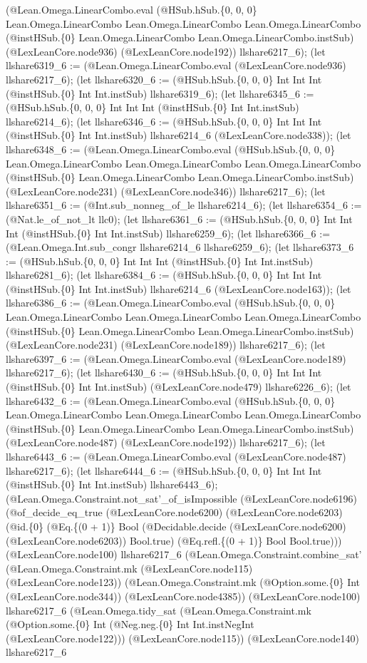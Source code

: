 \documentclass[11pt]{article}
\begin{document}
(@Lean.Omega.LinearCombo.eval (@HSub.hSub.\{0, 0, 0\} Lean.Omega.LinearCombo Lean.Omega.LinearCombo Lean.Omega.LinearCombo (@instHSub.\{0\} Lean.Omega.LinearCombo Lean.Omega.LinearCombo.instSub) (@LexLeanCore.node936) (@LexLeanCore.node192)) llshare6217\_6); (let llshare6319\_6 := (@Lean.Omega.LinearCombo.eval (@LexLeanCore.node936) llshare6217\_6); (let llshare6320\_6 := (@HSub.hSub.\{0, 0, 0\} Int Int Int (@instHSub.\{0\} Int Int.instSub) llshare6319\_6); (let llshare6345\_6 := (@HSub.hSub.\{0, 0, 0\} Int Int Int (@instHSub.\{0\} Int Int.instSub) llshare6214\_6); (let llshare6346\_6 := (@HSub.hSub.\{0, 0, 0\} Int Int Int (@instHSub.\{0\} Int Int.instSub) llshare6214\_6 (@LexLeanCore.node338)); (let llshare6348\_6 := (@Lean.Omega.LinearCombo.eval (@HSub.hSub.\{0, 0, 0\} Lean.Omega.LinearCombo Lean.Omega.LinearCombo Lean.Omega.LinearCombo (@instHSub.\{0\} Lean.Omega.LinearCombo Lean.Omega.LinearCombo.instSub) (@LexLeanCore.node231) (@LexLeanCore.node346)) llshare6217\_6); (let llshare6351\_6 := (@Int.sub\_nonneg\_of\_le llshare6214\_6); (let llshare6354\_6 := (@Nat.le\_of\_not\_lt llc0); (let llshare6361\_6 := (@HSub.hSub.\{0, 0, 0\} Int Int Int (@instHSub.\{0\} Int Int.instSub) llshare6259\_6); (let llshare6366\_6 := (@Lean.Omega.Int.sub\_congr llshare6214\_6 llshare6259\_6); (let llshare6373\_6 := (@HSub.hSub.\{0, 0, 0\} Int Int Int (@instHSub.\{0\} Int Int.instSub) llshare6281\_6); (let llshare6384\_6 := (@HSub.hSub.\{0, 0, 0\} Int Int Int (@instHSub.\{0\} Int Int.instSub) llshare6214\_6 (@LexLeanCore.node163)); (let llshare6386\_6 := (@Lean.Omega.LinearCombo.eval (@HSub.hSub.\{0, 0, 0\} Lean.Omega.LinearCombo Lean.Omega.LinearCombo Lean.Omega.LinearCombo (@instHSub.\{0\} Lean.Omega.LinearCombo Lean.Omega.LinearCombo.instSub) (@LexLeanCore.node231) (@LexLeanCore.node189)) llshare6217\_6); (let llshare6397\_6 := (@Lean.Omega.LinearCombo.eval (@LexLeanCore.node189) llshare6217\_6); (let llshare6430\_6 := (@HSub.hSub.\{0, 0, 0\} Int Int Int (@instHSub.\{0\} Int Int.instSub) (@LexLeanCore.node479) llshare6226\_6); (let llshare6432\_6 := (@Lean.Omega.LinearCombo.eval (@HSub.hSub.\{0, 0, 0\} Lean.Omega.LinearCombo Lean.Omega.LinearCombo Lean.Omega.LinearCombo (@instHSub.\{0\} Lean.Omega.LinearCombo Lean.Omega.LinearCombo.instSub) (@LexLeanCore.node487) (@LexLeanCore.node192)) llshare6217\_6); (let llshare6443\_6 := (@Lean.Omega.LinearCombo.eval (@LexLeanCore.node487) llshare6217\_6); (let llshare6444\_6 := (@HSub.hSub.\{0, 0, 0\} Int Int Int (@instHSub.\{0\} Int Int.instSub) llshare6443\_6); (@Lean.Omega.Constraint.not\_sat'\_of\_isImpossible (@LexLeanCore.node6196) (@of\_decide\_eq\_true (@LexLeanCore.node6200) (@LexLeanCore.node6203) (@id.\{0\} (@Eq.\{(0 + 1)\} Bool (@Decidable.decide (@LexLeanCore.node6200) (@LexLeanCore.node6203)) Bool.true) (@Eq.refl.\{(0 + 1)\} Bool Bool.true))) (@LexLeanCore.node100) llshare6217\_6 (@Lean.Omega.Constraint.combine\_sat' (@Lean.Omega.Constraint.mk (@LexLeanCore.node115) (@LexLeanCore.node123)) (@Lean.Omega.Constraint.mk (@Option.some.\{0\} Int (@LexLeanCore.node344)) (@LexLeanCore.node4385)) (@LexLeanCore.node100) llshare6217\_6 (@Lean.Omega.tidy\_sat (@Lean.Omega.Constraint.mk (@Option.some.\{0\} Int (@Neg.neg.\{0\} Int Int.instNegInt (@LexLeanCore.node122))) (@LexLeanCore.node115)) (@LexLeanCore.node140) llshare6217\_6 
\end{document}
